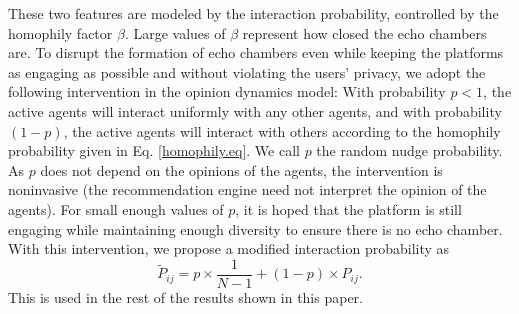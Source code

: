 \documentclass[%
 reprint,
superscriptaddress,
 amsmath,amssymb,
 aps,
 pre,
]{revtex4-1}
\begin{document}
These two features are modeled by the interaction probability, controlled by the homophily factor $\beta$. Large values of $\beta$ represent how closed the echo chambers are. To disrupt the formation of echo chambers even while keeping the platforms as engaging as possible and without violating the users' privacy, we adopt the following intervention in the opinion dynamics model:
With probability $p<1$, the active agents will interact uniformly with any other agents, and with probability $(1 - p)$, the active agents will interact with others according to the homophily probability given in Eq. \ref{homophily.eq}. We call $p$ the random nudge probability. As $p$ does not depend on the opinions of the agents, the intervention is noninvasive (the recommendation engine need not interpret the opinion of the agents). For small enough values of $p$, it is hoped that the platform is still engaging while maintaining enough diversity to ensure there is no echo chamber. With this intervention, we propose a modified interaction probability as 
\begin{equation}
    \label{intervention.eq}
    \widetilde P_{ij} = p \times \frac{1}{N - 1} + (1 - p) \times P_{ij}.
\end{equation}
This is used in the rest of the results shown in this paper.
\end{document}

